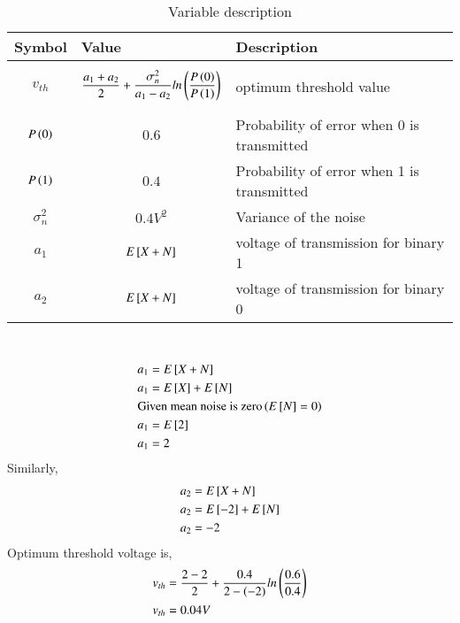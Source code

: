 \documentclass[journal,12pt,twocolumn]{IEEEtran}
\theoremstyle{remark}
\begin{document}
\solution
\begin{table}[h]
    \centering
    \begin{tabular}{|p{1cm}|p{3.80cm}|p{2.70cm}|}
    \hline
    Symbol&Value&Description\\ \hline
    $$v_{th}$$&$$\frac{a_1+a_2}{2}+\frac{\sigma_{n}^{2}}{a_1-a_2}ln\left(\frac{P\left(0\right)}{P\left(1\right)}\right)$$&optimum threshold value\\\hline
    $$P\left(0\right)$$&$$0.6$$&Probability of error when 0 is transmitted\\\hline
    $$P\left(1\right)$$&$$0.4$$&Probability of error when 1 is transmitted\\\hline
    $$\sigma_{n}^{2}$$&$$0.4V^2$$&Variance of the noise\\\hline
    $$a_1$$&$$E{}\left[X+N\right]$$&voltage of transmission for binary 1\\\hline
    $$a_2$$&$$E{}\left[X+N\right]$$&voltage of transmission for binary 0\\\hline
    \end{tabular}
    \caption{Variable description}
    \label{tab:GATE.2022.EC.53.1}
\end{table}\\
\begin{align}
    &a_1=E{}\left[X+N\right]\\
    &a_1=E{}\left[X\right]+E{}\left[N\right]\\
    &\text{Given mean noise is zero}\left(E{}\left[N\right]=0\right)\\
    &a_1=E{}\left[2\right]\\
    &a_1=2
\end{align}
Similarly,
\begin{align}
    &a_2=E{}\left[X+N\right]\\
    &a_2=E{}\left[-2\right]+E{}\left[N\right]\\
    &a_2=-2
\end{align}
Optimum threshold voltage is,
\begin{align}
    &v_{th}=\frac{2-2}{2}+\frac{0.4}{2-\left(-2\right)}ln\left(\frac{0.6}{0.4}\right)\\
    &v_{th}=0.04V
\end{align}
\end{document}
